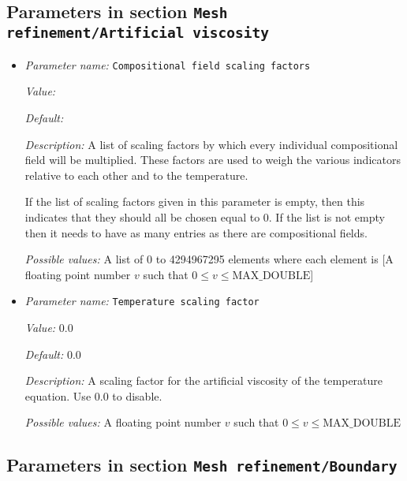 \subsection{Parameters in section \tt Mesh refinement/Artificial viscosity}
\label{parameters:Mesh_20refinement/Artificial_20viscosity}

\begin{itemize}
\item {\it Parameter name:} {\tt Compositional field scaling factors}
\label{parameters:Mesh refinement/Artificial viscosity/Compositional field scaling factors}


{\it Value:} 


{\it Default:} 


{\it Description:} A list of scaling factors by which every individual compositional field will be multiplied. These factors are used to weigh the various indicators relative to each other and to the temperature. 

If the list of scaling factors given in this parameter is empty, then this indicates that they should all be chosen equal to 0. If the list is not empty then it needs to have as many entries as there are compositional fields.


{\it Possible values:} A list of 0 to 4294967295 elements where each element is [A floating point number $v$ such that $0 \leq v \leq \text{MAX\_DOUBLE}$]
\item {\it Parameter name:} {\tt Temperature scaling factor}
\label{parameters:Mesh refinement/Artificial viscosity/Temperature scaling factor}


{\it Value:} 0.0


{\it Default:} 0.0


{\it Description:} A scaling factor for the artificial viscosity  of the temperature equation. Use 0.0 to disable.


{\it Possible values:} A floating point number $v$ such that $0 \leq v \leq \text{MAX\_DOUBLE}$
\end{itemize}

\subsection{Parameters in section \tt Mesh refinement/Boundary}
\label{parameters:Mesh_20refinement/Boundary}

